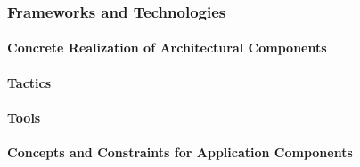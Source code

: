 \subsubsection{Frameworks and Technologies}
\paragraph{Concrete Realization of Architectural Components}
\paragraph{Tactics}
\paragraph{Tools}
\paragraph{Concepts and Constraints for Application Components}